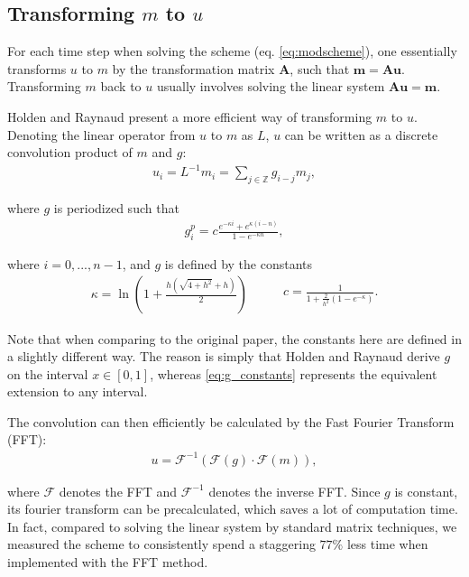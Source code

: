 \subsection*{Transforming $m$ to $u$}

For each time step when solving the scheme (eq. \ref{eq:modscheme}), one essentially transforms $u$ to $m$ by the transformation matrix $\bm{A}$, such that $\bm{m} = \bm{Au}$. Transforming $m$ back to $u$ usually involves solving the linear system $\bm{Au} = \bm{m}$. 

Holden and Raynaud \cite{holden2006convergence} present a more efficient way of transforming $m$ to $u$. Denoting the linear operator from $u$ to $m$ as $L$, $u$ can be written as a discrete convolution product of $m$ and $g$:
\begin{align*}
u_i = L^{-1} m_i = \sum\limits_{j \in \mathds{Z}} g_{i - j} m_j,
\end{align*}

where $g$ is periodized such that
\begin{align*}
g_i^p = c \frac{e^{-\kappa i} + e^{\kappa (i - n)}}{1 - e^{-\kappa n}},
\end{align*}

where $i = 0, ..., n - 1$, and $g$ is defined by the constants
\begin{equation}
\label{eq:g_constants}
\begin{aligned}
\kappa = \ln \left( 1 + \frac{h(\sqrt{4 + h^2} + h)}{2} \right)
\end{aligned}
\qquad
\begin{aligned}
c = \frac{1}{1 + \frac{2}{h^2} (1 - e^{-\kappa})}.
\end{aligned}
\end{equation}

Note that when comparing to the original paper, the constants here are defined in a slightly different way. The reason is simply that Holden and Raynaud derive $g$ on the interval $x \in [0, 1]$, whereas \eqref{eq:g_constants} represents the equivalent extension to any interval.

The convolution can then efficiently be calculated by the Fast Fourier Transform (FFT):
\begin{align*}
u = \mathcal{F}^{-1} (\mathcal{F} (g) \cdot \mathcal{F}(m)),
\end{align*}

where $\mathcal{F}$ denotes the FFT and $\mathcal{F}^{-1}$ denotes the inverse FFT. Since $g$ is constant, its fourier transform can be precalculated, which saves a lot of computation time. In fact, compared to solving the linear system by standard matrix techniques, we measured the scheme to consistently spend a staggering $77\%$ less time when implemented with the FFT method.

